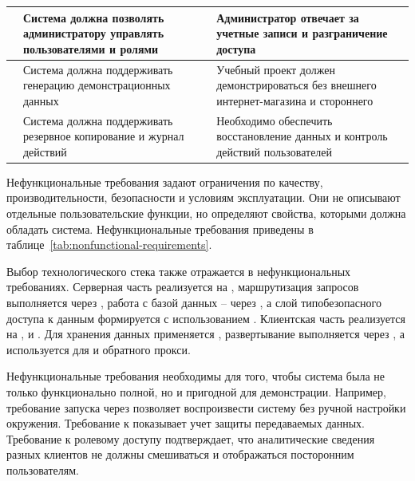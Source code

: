 {\begin{longtable}{|P{0.12\textwidth}|P{0.40\textwidth}|P{0.38\textwidth}|}
    \hline
     & Система должна позволять администратору управлять пользователями и ролями & Администратор отвечает за учетные записи и разграничение доступа \\
    \hline
     & Система должна поддерживать генерацию демонстрационных данных & Учебный проект должен демонстрироваться без внешнего интернет-магазина и стороннего  \\
    \hline
     & Система должна поддерживать резервное копирование и журнал действий & Необходимо обеспечить восстановление данных и контроль действий пользователей \\
    \hline
\end{longtable}
}

Нефункциональные требования задают ограничения по качеству, производительности, безопасности и условиям эксплуатации. Они не описывают отдельные пользовательские функции, но определяют свойства, которыми должна обладать система. Нефункциональные требования приведены в таблице~\ref{tab:nonfunctional-requirements}.

Выбор технологического стека также отражается в нефункциональных требованиях. Серверная часть реализуется на , маршрутизация запросов выполняется через , работа с базой данных -- через , а слой типобезопасного доступа к данным формируется с использованием . Клиентская часть реализуется на ,  и . Для хранения данных применяется , развертывание выполняется через , а  используется для  и обратного прокси.

Нефункциональные требования необходимы для того, чтобы система была не только функционально полной, но и пригодной для демонстрации. Например, требование запуска через  позволяет воспроизвести систему без ручной настройки окружения. Требование к  показывает учет защиты передаваемых данных. Требование к ролевому доступу подтверждает, что аналитические сведения разных клиентов не должны смешиваться и отображаться посторонним пользователям.

